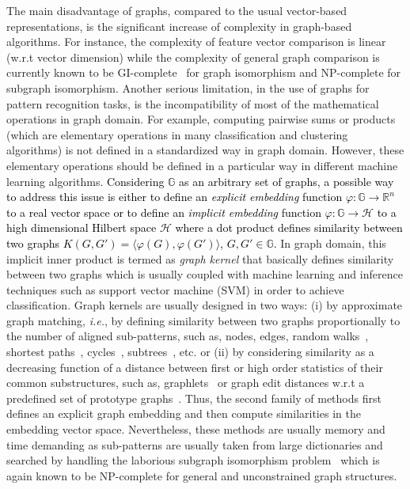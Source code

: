 \documentclass[journal]{IEEEtran}
\theoremstyle{definition}
\newcommand{\ie}{\textit{i.e.}}
\begin{document}
The main disadvantage of graphs, compared to the usual vector-based representations, is the significant increase of complexity in graph-based algorithms. For instance, the complexity of feature vector comparison is linear (w.r.t vector dimension) while the complexity of general graph comparison is currently known to be GI-complete~\cite{Kobler1994} for graph isomorphism and NP-complete for subgraph isomorphism. Another serious limitation, in the use of graphs for pattern recognition tasks, is the incompatibility of most of the mathematical operations in graph domain. For example, computing pairwise sums or products (which are elementary operations in many classification and clustering algorithms) is not defined in a standardized way in graph domain. However, these elementary operations should be defined in a particular way in different machine learning algorithms. \textcolor{black}{Considering $\mathbb{G}$ as an arbitrary set of graphs, a possible way to address this issue is either to define an \emph{explicit embedding} function $\varphi:\mathbb{G}\rightarrow \mathbb{R}^n$ to a real vector space or to define an \textit{implicit embedding} function $\varphi:\mathbb{G}\rightarrow \mathcal{H}$ to a high dimensional Hilbert space $\mathcal{H}$ where a dot product defines similarity between two graphs $K(G,G')=\langle \varphi(G),\varphi(G') \rangle$, $G,G'\in\mathbb{G}$.} In graph domain, this implicit inner product is termed as \emph{graph kernel} that basically defines similarity between two graphs which is usually coupled with machine learning and inference techniques such as support vector machine (SVM) in order to achieve classification. Graph kernels are usually designed in two ways: (i) by approximate graph matching, \ie, by defining similarity between two graphs proportionally to the number of aligned sub-patterns, such as, nodes, edges, random walks~\cite{Gartner2003}, shortest paths~\cite{Dupe2010}, cycles~\cite{Horvath2004}, subtrees~\cite{Shervashidze2009a}, etc. or (ii) by considering similarity as a decreasing function of a distance between first or high order statistics of their common substructures, such as, graphlets~\cite{Shervashidze2009,Saund2013} or graph edit distances w.r.t a predefined set of prototype graphs~\cite{Bunke2010}. Thus, the second family of methods first defines an explicit graph embedding and then compute similarities in the embedding vector space. Nevertheless, these methods are usually memory and time demanding as sub-patterns are usually taken from large dictionaries and searched by handling the laborious subgraph isomorphism problem~\cite{Mehlhorn1984} which is again known to be NP-complete for general and unconstrained graph structures.
\end{document}
